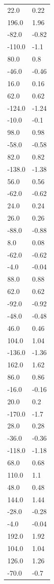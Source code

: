 \begin{longtable}{ll}
22.0 & 0.22 \\
196.0 & 1.96 \\
-82.0 & -0.82 \\
-110.0 & -1.1 \\
80.0 & 0.8 \\
-46.0 & -0.46 \\
16.0 & 0.16 \\
62.0 & 0.62 \\
-124.0 & -1.24 \\
-10.0 & -0.1 \\
98.0 & 0.98 \\
-58.0 & -0.58 \\
82.0 & 0.82 \\
-138.0 & -1.38 \\
56.0 & 0.56 \\
-62.0 & -0.62 \\
24.0 & 0.24 \\
26.0 & 0.26 \\
-88.0 & -0.88 \\
8.0 & 0.08 \\
-62.0 & -0.62 \\
-4.0 & -0.04 \\
88.0 & 0.88 \\
62.0 & 0.62 \\
-92.0 & -0.92 \\
-48.0 & -0.48 \\
46.0 & 0.46 \\
104.0 & 1.04 \\
-136.0 & -1.36 \\
162.0 & 1.62 \\
86.0 & 0.86 \\
-16.0 & -0.16 \\
20.0 & 0.2 \\
-170.0 & -1.7 \\
28.0 & 0.28 \\
-36.0 & -0.36 \\
-118.0 & -1.18 \\
68.0 & 0.68 \\
110.0 & 1.1 \\
48.0 & 0.48 \\
144.0 & 1.44 \\
-28.0 & -0.28 \\
-4.0 & -0.04 \\
192.0 & 1.92 \\
104.0 & 1.04 \\
126.0 & 1.26 \\
-70.0 & -0.7 \\

\end{longtable}
